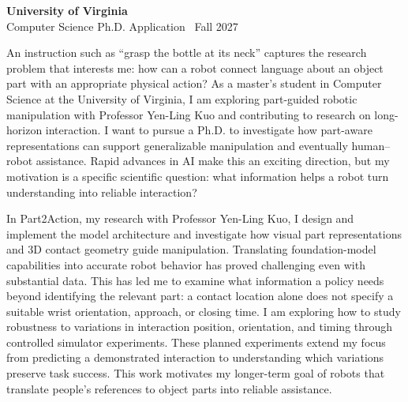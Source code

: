 \documentclass[11pt,letterpaper]{article}
\begin{document}
\begin{center}
  {\large\textbf{University of Virginia}}\\[3pt]
  Computer Science Ph.D. Application \textbar\ Fall 2027
\end{center}
\vspace{0.25\baselineskip}

An instruction such as ``grasp the bottle at its neck'' captures the research problem that interests me: how can a robot connect language about an object part with an appropriate physical action? As a master's student in Computer Science at the University of Virginia, I am exploring part-guided robotic manipulation with Professor Yen-Ling Kuo and contributing to research on long-horizon interaction. I want to pursue a Ph.D. to investigate how part-aware representations can support generalizable manipulation and eventually human--robot assistance. Rapid advances in AI make this an exciting direction, but my motivation is a specific scientific question: what information helps a robot turn understanding into reliable interaction?

In Part2Action, my research with Professor Yen-Ling Kuo, I design and implement the model architecture and investigate how visual part representations and 3D contact geometry guide manipulation. Translating foundation-model capabilities into accurate robot behavior has proved challenging even with substantial data. This has led me to examine what information a policy needs beyond identifying the relevant part: a contact location alone does not specify a suitable wrist orientation, approach, or closing time. I am exploring how to study robustness to variations in interaction position, orientation, and timing through controlled simulator experiments. These planned experiments extend my focus from predicting a demonstrated interaction to understanding which variations preserve task success. This work motivates my longer-term goal of robots that translate people's references to object parts into reliable assistance.
\end{document}
